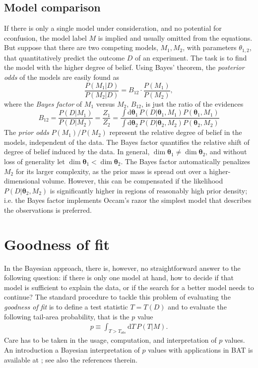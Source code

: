 \documentclass[
10pt,
a4paper,
bibliography=totoc,
captions=nooneline, %
numbers=noenddot,
twoside]{scrbook}
\newcommand{\BAT}{{\scshape BAT}\xspace}
\newcommand\rmdx[1]{\mbox{d}#1\,} %
\newcommand{\scath}{\theta} %
\newcommand{\vecth}{\bm{\theta}} %
\begin{document}
\subsection{Model comparison} \label{sec:model-comparison}

If there is only a single model under consideration, and no potential for
cconfusion, the model label $M$ is implied and usually omitted from the
equations. But suppose that there are two competing models, $M_1, M_2$, with
parameters $\scath_{1,2}$, that quantitatively predict the outcome $D$ of an
experiment. The task is to find the model with the higher degree of
belief. Using Bayes' theorem, the \emph{posterior odds} of the models are easily
found as
\begin{equation}
  \label{eq:post-odds}
  \frac{P(M_1|D)}{P(M_2|D)}
   = B_{12}  \cdot  \frac{P(M_1)}{P(M_2)},
\end{equation}
 where the \emph{Bayes factor} of $M_1$ versus $M_2$, $B_{12}$, is just the ratio
of the evidences
\begin{equation}
  \label{eq:Bayes-factor}
  B_{12}= \dfrac{P(D|M_1)}{P(D|M_2)} = \frac{Z_1}{Z_2}
  = \frac{\int \rmdx{\vecth_1} P(D|\vecth_1, M_1) P(\vecth_1, M_1)}
  {\int \rmdx{ \vecth_2} P(D|\vecth_2, M_2) P(\vecth_2, M_2)}
\end{equation}
The \emph{prior odds} $P(M_1)/P(M_2)$ represent the relative degree of belief
in the models, independent of the data.
The Bayes factor quantifies the relative shift of degree of belief
induced by the data. In general, $\dim \vecth_1 \ne \dim \vecth_2$,
and without loss of generality let $\dim \vecth_1 < \dim
\vecth_2$. The Bayes factor automatically penalizes $M_2$ for its
larger complexity, as the prior mass is spread out over a
higher-dimensional volume. However, this can be compensated if the
likelihood $P(D|\vecth_2, M_2)$ is significantly higher in regions of
reasonably high prior density; i.e. the Bayes factor implements
Occam's razor the simplest model that describes the observations is
preferred.

\section{Goodness of fit} \label{sec:goodness-fit} In the Bayesian
approach, there is, however, no straightforward answer to the
following question: if there is only one model at hand, how to decide
if that model is sufficient to explain the data, or if the search for
a better model needs to continue?  The standard procedure to tackle
this problem of evaluating the \emph{goodness of fit} is to define a
test statistic $T=T(D)$ and to evaluate the following tail-area
probability, that is the $p$ value
\begin{align}
  \label{eq:pvalue}
  p \equiv \int_{T>T_{obs}} \rmdx{T} P(T|M).
\end{align}
Care has to be taken in the usage, computation, and interpretation of
$p$ values. An introduction a Bayesian interpretation of $p$ values
with applications in \BAT is available at \cite{Beaujean:2011zz}; see
also the references therein.
\end{document}
